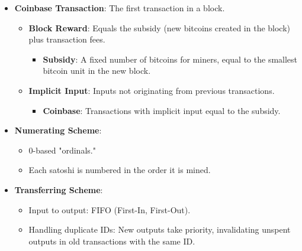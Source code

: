 \begin{itemize}
    \item \textbf{Coinbase Transaction}: The first transaction in a block.
    \begin{itemize}
        \item \textbf{Block Reward}: Equals the subsidy (new bitcoins created in the block) plus transaction fees.
        \begin{itemize}
            \item \textbf{Subsidy}: A fixed number of bitcoins for miners, equal to the smallest bitcoin unit in the new block.
        \end{itemize}
        \item \textbf{Implicit Input}: Inputs not originating from previous transactions.
        \begin{itemize}
            \item \textbf{Coinbase}: Transactions with implicit input equal to the subsidy.
        \end{itemize}
    \end{itemize}
    \item \textbf{Numerating Scheme}:
    \begin{itemize}
        \item 0-based "ordinals."
        \item Each satoshi is numbered in the order it is mined.
    \end{itemize}
    \item \textbf{Transferring Scheme}:
    \begin{itemize}
        \item Input to output: FIFO (First-In, First-Out).
        \item Handling duplicate IDs: New outputs take priority, invalidating unspent outputs in old transactions with the same ID.
    \end{itemize}
\end{itemize}

